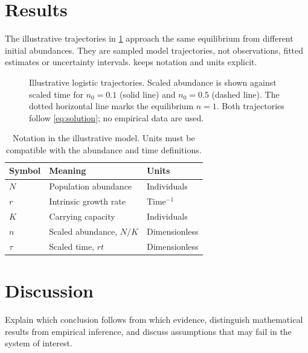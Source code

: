 \section{Results}\label{sec:results}
The illustrative trajectories in \cref{fig:trajectories} approach the same equilibrium from different initial abundances. They are sampled model trajectories, not observations, fitted estimates or uncertainty intervals.  keeps notation and units explicit.
\begin{figure}[htbp]
  \centering
  
  \caption{Illustrative logistic trajectories. Scaled abundance is shown against scaled time for $n_0=0.1$ (solid line) and $n_0=0.5$ (dashed line). The dotted horizontal line marks the equilibrium $n=1$. Both trajectories follow \cref{eq:solution}; no empirical data are used.}
  \label{fig:trajectories}
\end{figure}
\begin{table}[htbp]
  \caption{Notation in the illustrative model. Units must be compatible with the abundance and time definitions.}
  \label{tab:notation}
  \centering
  \begin{tabularx}{\linewidth}{@{}lXl@{}}\toprule
    Symbol & Meaning & Units\\\midrule
    $N$ & Population abundance & Individuals\\
    $r$ & Intrinsic growth rate & Time$^{-1}$\\
    $K$ & Carrying capacity & Individuals\\
    $n$ & Scaled abundance, $N/K$ & Dimensionless\\
    $\tau$ & Scaled time, $rt$ & Dimensionless\\\bottomrule
  \end{tabularx}
\end{table}

\FloatBarrier
\section{Discussion}\label{sec:discussion}
Explain which conclusion follows from which evidence, distinguish mathematical results from empirical inference, and discuss assumptions that may fail in the system of interest. 

